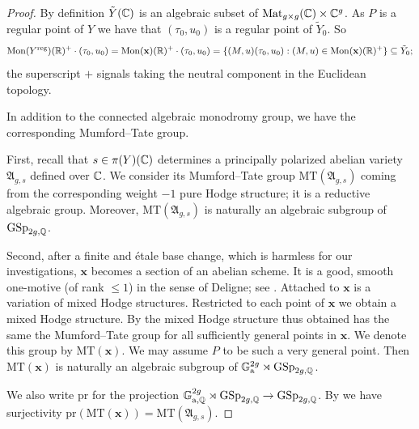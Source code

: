 \documentclass[12pt,oneside]{amsart}
\begin{document}
\begin{proof}
  
  By definition $\tilde Y({\mathbb{C}})$ is an algebraic subset of
  $\mathrm{Mat}_{g\times g}({\mathbb{C}})\times{\mathbb{C}}^{g}$. As $P$ is a regular
  point of $Y$ we have that $(\tau_0,u_0)$ is a regular point of
  $\tilde Y_0$. So
  \scriptsize
  \begin{equation}
    \label{eq:algebraicorbit}
    \mathrm{Mon}(Y^{\mathrm{reg}})(\IR)^+ \cdot (\tau_0,u_0)=
    \mathrm{Mon}(\mathbf{x})(\IR)^+ \cdot (\tau_0,u_0) = \{(M,u)(\tau_0,u_0) :
    (M,u)\in     \mathrm{Mon}(\mathbf{x})(\IR)^+ \} \subset \tilde
    Y_0; %
  \end{equation}  
  \normalsize
  the superscript $+$ signals taking the neutral component in the
  Euclidean topology.
  
  In addition to the connected algebraic monodromy group, we have the
  corresponding Mumford--Tate group. 

  First, recall that $s\in \pi(Y)({\mathbb{C}})$ determines a principally polarized
  abelian variety $\mathfrak{A}_{g,s}$ defined over ${\mathbb{C}}$. We consider
  its Mumford--Tate group $\mathrm{MT}(\mathfrak{A}_{g,s})$ coming
  from the corresponding weight $-1$ pure Hodge structure; it is a
  reductive algebraic group. Moreover,
  $\mathrm{MT}(\mathfrak{A}_{g,s})$ is naturally an algebraic subgroup
  of $\mathrm{GSp}_{2g,{\mathbb{Q}}}$.

  Second, after a finite and \'etale base change, which is harmless
  for our investigations, $\mathbf{x}$ becomes a section of an abelian
  scheme. It is a good, smooth one-motive (of rank $\le 1$) in the sense
  of Deligne; see \cite[$\mathsection$4 and Lemma~5]{Andre92}. Attached
  to $\mathbf{x}$ is a variation of mixed Hodge structures. 
  Restricted to each point of $\mathbf{x}$ we obtain a mixed Hodge
  structure. By \cite[$\mathsection$4 and Lemma~5]{Andre92} the mixed Hodge structure thus obtained
  has the same the Mumford--Tate group  for all sufficiently 
  general points in  $\mathbf{x}$. We denote this group by
  $\mathrm{MT}(\mathbf{x})$. We may assume $P$ to be such a very general
  point. Then $\mathrm{MT}(\mathbf{x})$ is naturally an algebraic
  subgroup of ${\mathbb{G}}_{\mathrm{a}}^{2g}\rtimes \mathrm{GSp}_{2g,{\mathbb{Q}}}$.

  We also write $\mathrm{pr}$ for the projection
  ${\mathbb{G}}_{\mathrm{a},{\mathbb{Q}}}^{2g}\rtimes \mathrm{GSp}_{2g,{\mathbb{Q}}}
  \rightarrow \mathrm{GSp}_{2g,{\mathbb{Q}}}$. By
\cite[Lemma~2(c)]{Andre92} we have surjectivity
  $\mathrm{pr}(\mathrm{MT}(\mathbf{x})) =
  \mathrm{MT}(\mathfrak{A}_{g,s})$. 




\end{proof}
\end{document}
